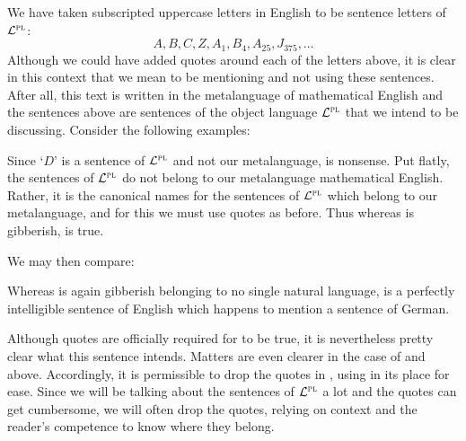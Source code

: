 
We have taken subscripted uppercase letters in English to be sentence letters of $\mathcal{L}^{\textsc{pl}}$:
	$$A, B, C, Z, A_1, B_4, A_{25}, J_{375},\ldots$$
Although we could have added quotes around each of the letters above, it is clear in this context that we mean to be mentioning and not using these sentences.
After all, this text is written in the metalanguage of mathematical English and the sentences above are sentences of the object language $\mathcal{L}^{\textsc{pl}}$ that we intend to be discussing.
Consider the following examples:

  \begin{earg} \label{disquote}
     \label{1}
     \label{2}
	\end{earg}

Since `$D$' is a sentence of $\mathcal{L}^{\textsc{pl}}$ and not our metalanguage,  is nonsense.
Put flatly, the sentences of $\mathcal{L}^{\textsc{pl}}$ do not belong to our metalanguage mathematical English.
Rather, it is the canonical names for the sentences of $\mathcal{L}^{\textsc{pl}}$ which belong to our metalanguage, and for this we must use quotes as before.
Thus whereas  is gibberish,  is true.

We may then compare:

  \begin{earg} \label{german}
     \label{1}
     \label{2}
	\end{earg}

Whereas  is again gibberish belonging to no single natural language,  is a perfectly intelligible sentence of English which happens to mention a sentence of German.

Although quotes are officially required for  to be true, it is nevertheless pretty clear what this sentence intends.
Matters are even clearer in the case of  and  above.
Accordingly, it is permissible to drop the quotes in , using  in its place for ease.
Since we will be talking about the sentences of $\mathcal{L}^{\textsc{pl}}$ a lot and the quotes can get cumbersome, we will often drop the quotes, relying on context and the reader's competence to know where they belong.

